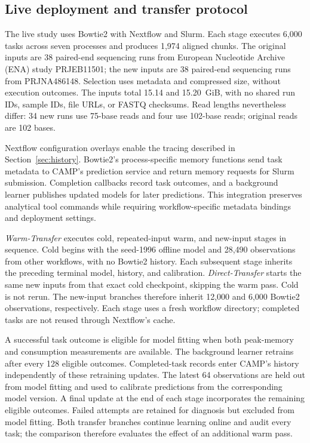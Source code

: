 \subsection{Live deployment and transfer protocol}
\label{sec:live-method}
The live study uses Bowtie2 with Nextflow and Slurm. Each stage executes
6,000 tasks across seven processes and produces 1,974 aligned chunks.
The original inputs are 38 paired-end sequencing runs from European
Nucleotide Archive (ENA) study PRJEB11501; the new inputs are 38 paired-end
sequencing runs from PRJNA486148. Selection uses metadata and compressed
size, without execution outcomes. The inputs total 15.14 and 15.20~GiB,
with no shared run IDs, sample IDs, file URLs, or FASTQ checksums. Read lengths nevertheless differ: 34 new runs
use 75-base reads and four use 102-base reads; original reads are 102 bases.

Nextflow configuration overlays enable the tracing described in
Section~\ref{sec:history}. Bowtie2's process-specific memory functions send
task metadata to CAMP's prediction service and return memory requests for
Slurm submission. Completion callbacks record task outcomes, and a
background learner publishes updated models for later predictions. This
integration preserves analytical tool commands while requiring
workflow-specific metadata bindings and deployment settings.

\emph{Warm-Transfer} executes cold, repeated-input warm, and new-input
stages in sequence. Cold begins with the seed-1996 offline model and
28,490 observations from other workflows, with no Bowtie2 history.
Each subsequent stage inherits the preceding terminal model, history,
and calibration. \emph{Direct-Transfer} starts the same new inputs from
that exact cold checkpoint, skipping the warm pass. Cold is not rerun.
The new-input branches therefore inherit 12,000 and 6,000 Bowtie2
observations, respectively. Each stage uses a fresh workflow directory;
completed tasks are not reused through Nextflow's cache.

A successful task outcome is eligible for model fitting when both
peak-memory and consumption measurements are available. The background
learner retrains after every 128 eligible outcomes. Completed-task records
enter CAMP's history
independently of these retraining updates. The latest 64 observations are
held out from model fitting and used to calibrate predictions from the
corresponding model version. A final update at the end of each stage
incorporates the remaining eligible outcomes. Failed attempts are retained
for diagnosis but excluded from model fitting. Both transfer branches
continue learning online and audit every task; the comparison therefore
evaluates the effect of an additional warm pass.

